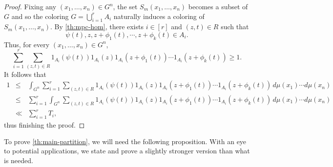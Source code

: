 \documentclass[10pt]{article}
\theoremstyle{definition}
\begin{document}
\begin{proof}
Fixing any $(x_1, \ldots, x_n) \in G^n$, the set $S_m(x_1, \ldots, x_n)$ becomes a subset of $G$ and so the coloring $G = \bigcup_{i=1}^r A_i$ naturally induces a coloring of $S_m(x_1, \ldots, x_n)$. By \cref{th:mpc-hom}, there exists $i \in [r]$ and $(z, t) \in R$ such that
\[
    \psi(t), z, z+ \phi_1(t), \cdots, z+ \phi_k(t) \in A_i.
\]
Thus, for every $(x_1, \ldots, x_n) \in G^n$,
\[
    \sum_{i=1}^r \sum_{(z, t) \in R } 1_{A_i}( \psi(t)) 1_{A_i}(z) 1_{A_i}(z+ \phi_1(t)) \cdots 1_{A_i}(z+ \phi_k(t)) \geq 1.
\]
It follows that
\begin{eqnarray*}
1 & \leq & \int_{G^n} \sum_{i=1}^r \sum_{(z, t) \in R } 1_{A_i}( \psi(t)) 1_{A_i}(z) 1_{A_i}(z+ \phi_1(t)) \cdots 1_{A_i}(z+ \phi_k(t)) \, d\mu(x_1) \cdots d\mu(x_n) \\
&\leq& \sum_{i=1}^r  \int_{G^n} \sum_{(z, t) \in R } 1_{A_i}( \psi(t)) 1_{A_i}(z) 1_{A_i}(z+ \phi_1(t)) \cdots 1_{A_i}(z+ \phi_k(t)) \, d\mu(x_1) \cdots d\mu(x_n)  \\
& \ll & \sum_{i=1}^r T_i,   
\end{eqnarray*}
thus finishing the proof.
\end{proof}

To prove \cref{th:main-partition}, we will need the following proposition. 
With an eye to potential applications, we state and prove a slightly stronger version than what is needed.



\end{document}
